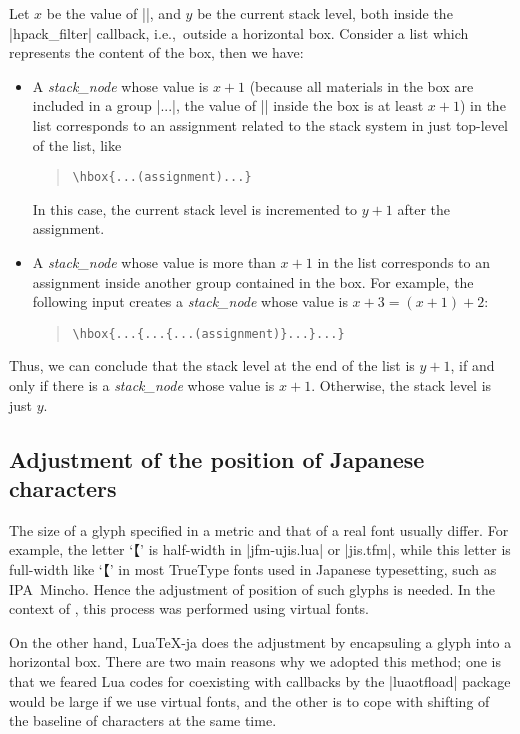 \documentclass{ajt}
\begin{document}
Let $x$ be the value of |\currentgrouplevel|, and $y$ be the current
stack level, both inside the |hpack_filter| callback, i.e.,~outside a
horizontal box. Consider a list which represents the content of the box,
then we have:
\begin{itemize}
\item A \emph{stack\_node} whose value is $x+1$ (because all materials
      in the box are included in a group |\hbox{...}|, the value of
      |\currentgrouplevel| inside the box is at least $x+1$) in the list
      corresponds to an assignment related to the stack system in just
      top-level of the list, like
\begin{quote}
\begin{verbatim}
\hbox{...(assignment)...}
\end{verbatim}
\end{quote}
In this case, the current stack level is incremented to $y+1$ after the assignment.
\item A \emph{stack\_node} whose value is more than  $x+1$ in the list corresponds
to an assignment inside another group contained in the box. For example,
      the following input creates
a \emph{stack\_node} whose value is $x+3=(x+1)+2$:
\begin{quote}
\begin{verbatim}
\hbox{...{...{...(assignment)}...}...}
\end{verbatim}
\end{quote}
\end{itemize}
Thus, we can conclude that the stack level at the end of the list is
$y+1$, if and only if there is a \emph{stack\_node} whose value is
$x+1$. Otherwise, the stack level is just $y$.

\subsection{Adjustment of the position of Japanese characters}
\label{ssec-width}

The size of a glyph specified in a metric and that of a real font
usually differ. For example, the letter `\inhibitglue【' is half-width
in |jfm-ujis.lua| or |jis.tfm|, while this letter is full-width like `【'
in most TrueType fonts used in Japanese typesetting, such as
IPA~Mincho. Hence the adjustment of position of such glyphs is
needed. In the context of \pTeX, this process was performed using virtual fonts.

On the other hand, Lua\TeX-ja does the adjustment by encapsuling a glyph
into a horizontal box. There are two main reasons why we adopted this
method; one is that we feared Lua codes for coexisting with callbacks by
the |luaotfload| package would be large if we use virtual fonts, and the
other is to cope with shifting of the baseline of characters at the
same time. 
\end{document}
